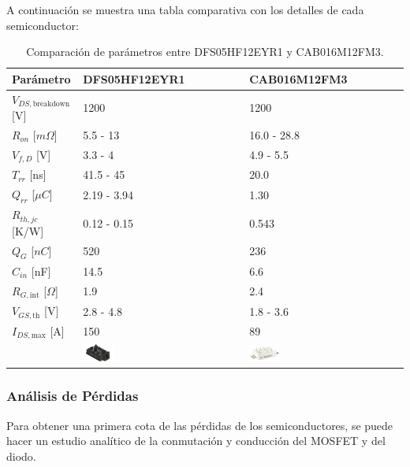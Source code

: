 A continuación se muestra una tabla comparativa con los detalles de cada semiconductor:
\begin{table}[H]
	\centering
	\begin{tabular}{|l|l|l|}
		\hline
		\textbf{Parámetro} & \textbf{DFS05HF12EYR1} & \textbf{CAB016M12FM3} \\ \hline
		\(V_{DS,\text{breakdown}}\) [V] & 1200 & 1200 \\ \hline
		\(R_{on}\) [\(m \Omega\)] & 5.5 - 13 & 16.0 - 28.8 \\ \hline
		\(V_{f,D}\) [V] & 3.3 - 4 & 4.9 - 5.5 \\ \hline
		\(T_{rr}\) [ns] & 41.5 - 45 & 20.0 \\ \hline
		\(Q_{rr}\) [\(\mu C\)] & 2.19 - 3.94 & 1.30 \\ \hline
		\(R_{th,jc}\) [K/W] & 0.12 - 0.15 & 0.543 \\ \hline
		\(Q_{G}\) [\(nC\)] & 520 & 236 \\ \hline
		\(C_{in}\) [nF] & 14.5 & 6.6 \\ \hline
		\(R_{G,\text{int}}\) [\(\Omega\)] & 1.9 & 2.4 \\ \hline
		\(V_{GS,\text{th}}\) [V] & 2.8 - 4.8 & 1.8 - 3.6 \\ \hline
		\(I_{DS,\text{max}}\) [A] & 150 & 89 \\ \hline
		& \includegraphics[width=0.2\textwidth]{fig/DFS05.png} & \includegraphics[width=0.2\textwidth]{fig/CAB016.png} \\
		\hline
	\end{tabular}
	\caption{Comparación de parámetros entre DFS05HF12EYR1 y CAB016M12FM3.}
\end{table}


\subsubsection{Análisis de Pérdidas}

Para obtener una primera cota de las pérdidas de los semiconductores, se puede hacer un estudio analítico de la conmutación y conducción del MOSFET y del diodo. 

